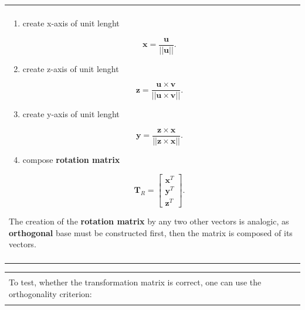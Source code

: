 \documentclass[10pt,b5paper,titlepage]{book}
\newenvironment{bbox}[1][0.96]
{
    \begin{center}
        \begin{tabular}{|p{#1\textwidth}|}
            \hline\\
}
{
            \\\\\hline
        \end{tabular}
    \end{center}
}
\begin{document}
\begin{enumerate}
\begin{bbox}[0.85]
            \begin{enumerate}
                \item create x-axis of unit lenght

                    \begin{equation}
                        \mathbf{x} = \frac{\mathbf{u}}{||\mathbf{u}||}
                    .\end{equation}

                \item create z-axis of unit lenght

                    \begin{equation}
                        \mathbf{z}
                        = \frac{\mathbf{u} \times \mathbf{v}}{||\mathbf{u} \times \mathbf{v}||}
                    .\end{equation}

                \item create y-axis of unit lenght

                    \begin{equation}
                        \mathbf{y}
                        = \frac{\mathbf{z} \times \mathbf{x}}{||\mathbf{z} \times \mathbf{x}||}
                    .\end{equation}

                \item compose \textbf{rotation matrix}

                    \begin{equation}
                        \mathbf{T}_{R} = \begin{bmatrix}
                            \mathbf{x}^{T} \\
                            \mathbf{y}^{T} \\
                            \mathbf{z}^{T}
                        \end{bmatrix}
                    .\end{equation}
            \end{enumerate}

            The creation of the \textbf{rotation matrix} by any two other vectors is
            analogic, as \textbf{orthogonal} base must be constructed first, then
            the matrix is composed of its vectors.
        \end{bbox}

        \begin{bbox}[0.85]
            To test, whether the transformation matrix is correct, one can use
            the orthogonality criterion:


\end{bbox}
\end{enumerate}
\end{document}
